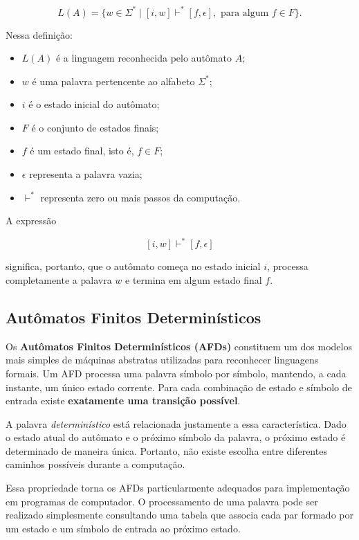 \documentclass[
  brazilian,
  letterpaper,
]{book}
\providecommand{\tightlist}{%
  \setlength{\itemsep}{0pt}\setlength{\parskip}{0pt}}
\theoremstyle{plain}
\theoremstyle{definition}
\theoremstyle{remark}
\begin{document}
\[
L(A)=
\{w\in\Sigma^*
\mid
[i,w]\vdash^*[f,\epsilon],
\text{ para algum } f\in F
\}.
\]

Nessa definição:

\begin{itemize}
\tightlist
\item
  \(L(A)\) é a linguagem reconhecida pelo autômato \(A\);
\item
  \(w\) é uma palavra pertencente ao alfabeto \(\Sigma^*\);
\item
  \(i\) é o estado inicial do autômato;
\item
  \(F\) é o conjunto de estados finais;
\item
  \(f\) é um estado final, isto é, \(f\in F\);
\item
  \(\epsilon\) representa a palavra vazia;
\item
  \(\vdash^*\) representa zero ou mais passos da computação.
\end{itemize}

A expressão

\[
[i,w]\vdash^*[f,\epsilon]
\]

significa, portanto, que o autômato começa no estado inicial \(i\),
processa completamente a palavra \(w\) e termina em algum estado final
\(f\).

\subsection{Autômatos Finitos
Determinísticos}\label{autuxf4matos-finitos-determinuxedsticos}

Os \textbf{Autômatos Finitos Determinísticos (AFDs)} constituem um dos
modelos mais simples de máquinas abstratas utilizadas para reconhecer
linguagens formais. Um AFD processa uma palavra símbolo por símbolo,
mantendo, a cada instante, um único estado corrente. Para cada
combinação de estado e símbolo de entrada existe \textbf{exatamente uma
transição possível}.

A palavra \emph{determinístico} está relacionada justamente a essa
característica. Dado o estado atual do autômato e o próximo símbolo da
palavra, o próximo estado é determinado de maneira única. Portanto, não
existe escolha entre diferentes caminhos possíveis durante a computação.

Essa propriedade torna os AFDs particularmente adequados para
implementação em programas de computador. O processamento de uma palavra
pode ser realizado simplesmente consultando uma tabela que associa cada
par formado por um estado e um símbolo de entrada ao próximo estado.
\end{document}
